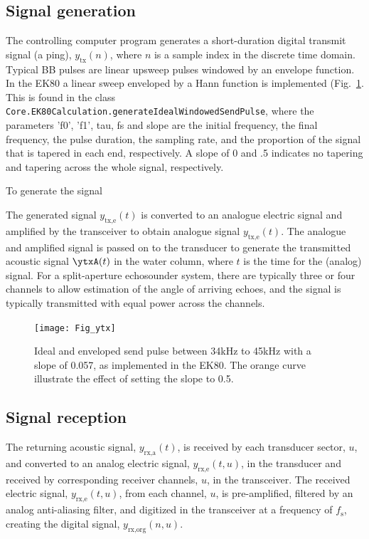 \documentclass[preprint,12pt,TurnOnLineNumbers]{JASAnew}
\newcommand{\timesym}{t}
\newcommand{\samplesymt}{n}
\newcommand{\channelsym}{u}
\newcommand{\fs}{f_{\textrm{s}}}
\newcommand{\ytxe}{y_{\textrm{tx,e}}}
\newcommand{\yrxa}{y_{\textrm{rx,a}}}
\newcommand{\yrxe}{y_{\textrm{rx,e}}}
\newcommand{\ytx}{y_{\textrm{tx}}}
\newcommand{\yrxorg}{y_{\textrm{rx,org}}}
\begin{document}
\subsection{Signal generation}

The controlling computer program generates a short-duration digital transmit signal (a ping), $\ytx(\samplesymt)$, where $\samplesymt$ is a sample index in the discrete time domain. Typical BB pulses are linear upsweep pulses windowed by an envelope function. In the EK80 a linear sweep enveloped by a Hann function is implemented (Fig.~\ref{fi:ytx}. This is found in the class \verb|Core.EK80Calculation.generateIdealWindowedSendPulse|, where the parameters 'f0', 'f1', tau, fs and slope are the initial frequency, the final frequency, the pulse duration, the sampling rate, and the proportion of the signal that is tapered in each end, respectively. A slope of 0 and .5 indicates no tapering and tapering across the whole signal, respectively.

To generate the signal

The generated signal $\ytxe(\timesym)$ is converted to an analogue electric signal and amplified by the transceiver to obtain analogue signal $\ytxe(\timesym)$. The analogue and amplified signal is passed on to the transducer to generate the transmitted acoustic signal $\ytxA(\timesym)$ in the water column, where $\timesym$ is the time for the (analog) signal. For a split-aperture echosounder system, there are typically three or four channels to allow estimation of the angle of arriving echoes, and the signal is typically transmitted with equal power across the channels.

\begin{figure}
\texttt{[image: Fig\_ytx]}
\caption{\label{fi:ytx} Ideal and enveloped send pulse between 34kHz to 45kHz with a slope of 0.057, as implemented in the EK80. The orange curve illustrate the effect of setting the slope to 0.5.}
\end{figure}

\subsection{Signal reception}

The returning acoustic signal, $\yrxa(\timesym)$, is received by each transducer sector, $\channelsym$, and converted to an analog electric signal, $\yrxe(\timesym,\channelsym)$, in the transducer and received by corresponding receiver channels, $\channelsym$, in the transceiver. The received electric signal, $\yrxe(\timesym,\channelsym)$, from each channel, $\channelsym$, is pre-amplified, filtered by an analog anti-aliasing filter, and digitized in the transceiver at a frequency of $\fs$, creating the digital signal, $\yrxorg(\samplesymt,\channelsym)$.
\end{document}
